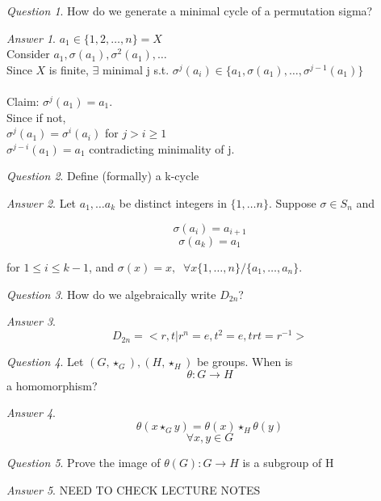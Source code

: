 \documentclass[]{article}
\theoremstyle{remark}
\theoremstyle{qnstyle}
\newtheorem{question}{Question}
\theoremstyle{answerstyle}
\newtheorem*{answer}{Answer}
\begin{document}
{
    \begin{question}
        How do we generate a minimal cycle of a permutation sigma?
    \end{question}
    \begin{answer}
        $a_1 \in \{1, 2, \ldots, n \} = X$ \\
        Consider $a_1, \sigma(a_1), \sigma^2(a_1), \ldots$ \\
        Since $X$ is finite, $\exists$ minimal j s.t. $\sigma^j(a_i) \in \{a_1, \sigma(a_1), \ldots, \sigma^{j-1}(a_1) \}$ \\ \\

        Claim: $\sigma^j(a_1) = a_1$. \\
        Since if not, \\
        $\sigma^j(a_1) = \sigma^i(a_i)$ for $j > i \geq 1$ \\
        $\sigma^{j-i}(a_1) = a_1$ contradicting minimality of j. \\

    \end{answer}
}
{
    \begin{question}
        Define (formally) a k-cycle
    \end{question}
    \begin{answer}
        Let $a_1, \ldots a_k$ be distinct integers in $\{1, \ldots n\}$. Suppose $\sigma \in S_n$ and

        $$\sigma(a_i) = a_{i+1}$$
        $$\sigma(a_k) = a_1$$

        for $1 \leq i \leq k-1$, and $\sigma(x) = x, \;\; \forall x \{1, \ldots, n \} / \{a_1, \ldots, a_n\}$.
    \end{answer}
}
{
    \begin{question}
        How do we algebraically write $D_{2n}$?
    \end{question}
    \begin{answer}
        $$D_{2n} = <r,t \vert r^n =e, t^2 = e, trt = r^{-1}>$$
    \end{answer}
}
{
    \begin{question}
        Let $(G, \star_G), (H, \star_H)$ be groups. When is  $$\theta: G \to H$$ a homomorphism?
    \end{question}
    \begin{answer}
        $$\theta(x \star_G y) = \theta(x) \star_H \theta(y)$$
$$\forall x,y \in G$$
    \end{answer}
}
{
    \begin{question}
        Prove the image of $\theta(G): G \to H$ is a subgroup of H
    \end{question}
    \begin{answer}
        NEED TO CHECK LECTURE NOTES
    \end{answer}
}
\end{document}
